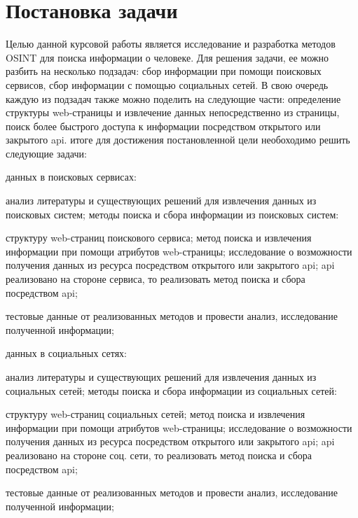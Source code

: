 \section{Постановка задачи}
\label{sec:Chapter1} 
Целью данной курсовой работы является исследование и разработка методов OSINT для поиска информации о человеке. 
Для решения задачи, ее можно разбить на несколько подзадач: сбор информации при помощи поисковых сервисов, 
сбор информации с помощью социальных сетей. В свою очередь каждую из подзадач также можно поделить на следующие части:
определение структуры web-страницы и извлечение данных непосредственно из страницы, поиск более быстрого доступа к информации 
посредством открытого или закрытого api.
 итоге для достижения постановленной цели необоходимо решить следующие задачи:
\begin{itemize}
     данных в поисковых сервисах:
    \begin{itemize}
         анализ литературы и существующих решений для извлечения данных из поисковых систем;
         методы поиска и сбора информации из поисковых систем:
        \begin{itemize}
             структуру web-страниц поискового сервиса;
             метод поиска и извлечения информации при помощи атрибутов web-страницы;
             исследование о возможности получения данных из ресурса посредством открытого или закрытого api;
             api реализовано на стороне сервиса, то реализовать метод поиска и сбора посредством api;
        \end{itemize}
         тестовые данные от реализованных методов и провести анализ, исследование полученной информации; 
    \end{itemize}
     данных в социальных сетях:
    \begin{itemize}
         анализ литературы и существующих решений для извлечения данных из социальных сетей;
         методы поиска и сбора информации из социальных сетей:
        \begin{itemize}
             структуру web-страниц социальных сетей;
             метод поиска и извлечения информации при помощи атрибутов web-страницы;
             исследование о возможности получения данных из ресурса посредством открытого или закрытого api;
             api реализовано на стороне соц. сети, то реализовать метод поиска и сбора посредством api;
        \end{itemize}
         тестовые данные от реализованных методов и провести анализ, исследование полученной информации; 
    \end{itemize}
\end{itemize}